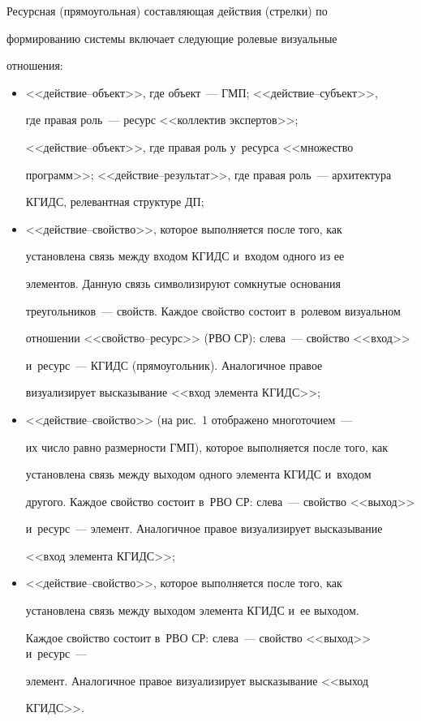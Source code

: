  

  Ресурсная (прямоугольная) со\-став\-ля\-ющая действия (стрел\-ки) по 

формированию сис\-те\-мы вклю\-ча\-ет сле\-ду\-ющие ролевые визуальные 

отношения: 






\noindent

  \begin{itemize}

\item <<действие--объект>>, где объект~--- ГМП; <<дей\-ст\-вие--субъ\-ект>>, 

где правая роль~--- ресурс <<коллектив экспертов>>;  

<<дей\-ст\-вие--объ\-ект>>, где правая роль у~ресурса <<множество 

программ>>; <<дей\-ст\-вие--ре\-зуль\-тат>>, где правая роль~--- архитектура 

КГИДС, релевантная структуре ДП;

\item <<действие--свой\-ст\-во>>, которое выполняется после того, как 

установлена связь между входом \mbox{КГИДС} и~входом одного из ее 

элементов. Данную связь символизируют сомкнутые основания 

треугольников~--- свойств. Каждое свойство со\-сто\-ит в~ролевом визуальном 

отношении <<свой\-ст\-во--ре\-сурс>> (РВО СР): слева~--- свойство <<вход>>  

и~ресурс~--- \mbox{КГИДС} (прямоугольник). Аналогичное правое 

визуализирует вы\-ска\-зы\-ва\-ние <<вход элемента \mbox{КГИДС}>>;

\item <<действие--свой\-ст\-во>> (на рис.~1 отоб\-ра\-же\-но многоточием~--- 

их чис\-ло рав\-но раз\-мер\-ности ГМП), которое выполняется после того, как 

установлена связь между выходом одного элемента \mbox{КГИДС} и~входом 

другого. Каждое свойство состоит в~РВО СР: слева~--- свойство <<выход>> 

и~ресурс~--- элемент. Аналогичное правое визуализирует высказывание 

<<вход элемента \mbox{КГИДС}>>;

\item <<действие--свой\-ст\-во>>, которое выполняется после того, как 

установлена связь между выходом элемента \mbox{КГИДС} и~ее выходом. 

Каждое свойство состоит в~РВО СР: слева~--- свойство <<выход>> и~ресурс~--- 

элемент. Аналогичное правое визуализирует высказывание <<выход 

\mbox{КГИДС}>>.

\end{itemize}



